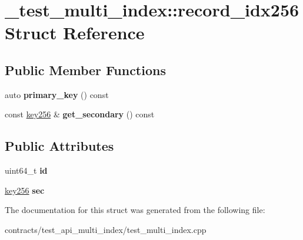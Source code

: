 \hypertarget{struct__test__multi__index_1_1record__idx256}{}\section{\+\_\+test\+\_\+multi\+\_\+index\+:\+:record\+\_\+idx256 Struct Reference}
\label{struct__test__multi__index_1_1record__idx256}
\subsection*{Public Member Functions}
\begin{DoxyCompactItemize}
\item 
\mbox{\label{struct__test__multi__index_1_1record__idx256_a7b734e78473e78d7ac1a6356acbe9cf9}} 
auto {\bfseries primary\+\_\+key} () const
\item 
\mbox{\label{struct__test__multi__index_1_1record__idx256_a7455a9ab11cb211fa1ebeb5c275a2a5f}} 
const \mbox{\hyperlink{classaacio_1_1fixed__key}{key256}} \& {\bfseries get\+\_\+secondary} () const
\end{DoxyCompactItemize}
\subsection*{Public Attributes}
\begin{DoxyCompactItemize}
\item 
\mbox{\label{struct__test__multi__index_1_1record__idx256_affe6a500a0af844434f84d5b935d619a}} 
uint64\+\_\+t {\bfseries id}
\item 
\mbox{\label{struct__test__multi__index_1_1record__idx256_ad33bd1d9dc71172c7b9e470302e72b7a}} 
\mbox{\hyperlink{classaacio_1_1fixed__key}{key256}} {\bfseries sec}
\end{DoxyCompactItemize}


The documentation for this struct was generated from the following file\+:\begin{DoxyCompactItemize}
\item 
contracts/test\+\_\+api\+\_\+multi\+\_\+index/test\+\_\+multi\+\_\+index.\+cpp\end{DoxyCompactItemize}
